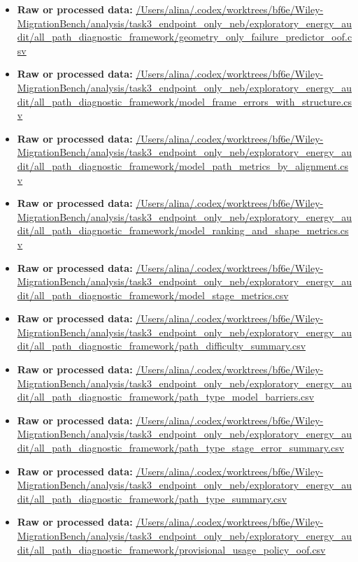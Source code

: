 \begin{itemize}[leftmargin=1.4em,noitemsep]
\item \textbf{Raw or processed data:} \url{/Users/alina/.codex/worktrees/bf6e/Wiley-MigrationBench/analysis/task3_endpoint_only_neb/exploratory_energy_audit/all_path_diagnostic_framework/geometry_only_failure_predictor_oof.csv}
\item \textbf{Raw or processed data:} \url{/Users/alina/.codex/worktrees/bf6e/Wiley-MigrationBench/analysis/task3_endpoint_only_neb/exploratory_energy_audit/all_path_diagnostic_framework/model_frame_errors_with_structure.csv}
\item \textbf{Raw or processed data:} \url{/Users/alina/.codex/worktrees/bf6e/Wiley-MigrationBench/analysis/task3_endpoint_only_neb/exploratory_energy_audit/all_path_diagnostic_framework/model_path_metrics_by_alignment.csv}
\item \textbf{Raw or processed data:} \url{/Users/alina/.codex/worktrees/bf6e/Wiley-MigrationBench/analysis/task3_endpoint_only_neb/exploratory_energy_audit/all_path_diagnostic_framework/model_ranking_and_shape_metrics.csv}
\item \textbf{Raw or processed data:} \url{/Users/alina/.codex/worktrees/bf6e/Wiley-MigrationBench/analysis/task3_endpoint_only_neb/exploratory_energy_audit/all_path_diagnostic_framework/model_stage_metrics.csv}
\item \textbf{Raw or processed data:} \url{/Users/alina/.codex/worktrees/bf6e/Wiley-MigrationBench/analysis/task3_endpoint_only_neb/exploratory_energy_audit/all_path_diagnostic_framework/path_difficulty_summary.csv}
\item \textbf{Raw or processed data:} \url{/Users/alina/.codex/worktrees/bf6e/Wiley-MigrationBench/analysis/task3_endpoint_only_neb/exploratory_energy_audit/all_path_diagnostic_framework/path_type_model_barriers.csv}
\item \textbf{Raw or processed data:} \url{/Users/alina/.codex/worktrees/bf6e/Wiley-MigrationBench/analysis/task3_endpoint_only_neb/exploratory_energy_audit/all_path_diagnostic_framework/path_type_stage_error_summary.csv}
\item \textbf{Raw or processed data:} \url{/Users/alina/.codex/worktrees/bf6e/Wiley-MigrationBench/analysis/task3_endpoint_only_neb/exploratory_energy_audit/all_path_diagnostic_framework/path_type_summary.csv}
\item \textbf{Raw or processed data:} \url{/Users/alina/.codex/worktrees/bf6e/Wiley-MigrationBench/analysis/task3_endpoint_only_neb/exploratory_energy_audit/all_path_diagnostic_framework/provisional_usage_policy_oof.csv}

\end{itemize}
